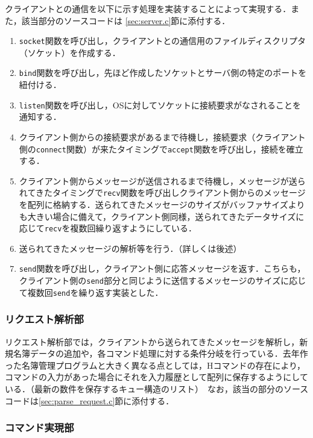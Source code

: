 \documentclass[11pt]{jsarticle}
\begin{document}
クライアントとの通信を以下に示す処理を実装することによって実現する．また，該当部分のソースコードは \ref{sec:server.c}節に添付する．

\begin{enumerate}
      \item {\tt socket}関数を呼び出し，クライアントとの通信用のファイルディスクリプタ（ソケット）を作成する．
      \item {\tt bind}関数を呼び出し，先ほど作成したソケットとサーバ側の特定のポートを紐付ける．
      \item {\tt listen}関数を呼び出し，OSに対してソケットに接続要求がなされることを通知する．
      \item クライアント側からの接続要求があるまで待機し，接続要求（クライアント側の{\tt connect}関数）が来たタイミングで{\tt accept}関数を呼び出し，接続を確立する．
      \item クライアント側からメッセージが送信されるまで待機し，メッセージが送られてきたタイミングで{\tt recv}関数を呼び出しクライアント側からのメッセージを配列に格納する．送られてきたメッセージのサイズがバッファサイズよりも大きい場合に備えて，クライアント側同様，送られてきたデータサイズに応じて{\tt recv}を複数回繰り返すようにしている．
      \item 送られてきたメッセージの解析等を行う．（詳しくは後述）
      \item {\tt send}関数を呼び出し，クライアント側に応答メッセージを返す．こちらも，クライアント側の{\tt send}部分と同じように送信するメッセージのサイズに応じて複数回{\tt send}を繰り返す実装とした．
\end{enumerate}

\subsubsection{リクエスト解析部}

リクエスト解析部では，クライアントから送られてきたメッセージを解析し，新規名簿データの追加や，各コマンド処理に対する条件分岐を行っている．去年作った名簿管理プログラムと大きく異なる点としては，Hコマンドの存在により，コマンドの入力があった場合にそれを入力履歴として配列に保存するようにしている．（最新の数件を保存するキュー構造のリスト）　なお，該当の部分のソースコードは\ref{sec:parse_request.c}節に添付する．

\subsubsection{コマンド実現部}
\end{document}
